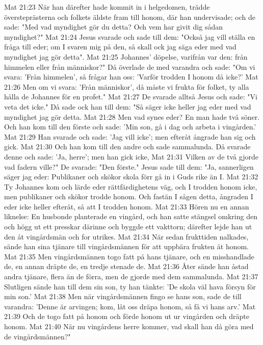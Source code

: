 Mat 21:23  När han därefter hade kommit in i helgedomen, trädde översteprästerna och folkets äldste fram till honom, där han undervisade; och de sade: "Med vad myndighet gör du detta? Och vem har givit dig sådan myndighet?"
Mat 21:24  Jesus svarade och sade till dem: "Också jag vill ställa en fråga till eder; om I svaren mig på den, så skall ock jag säga eder med vad myndighet jag gör detta".
Mat 21:25  Johannes' döpelse, varifrån var den: från himmelen eller från människor?" Då överlade de med varandra och sade: "Om vi svara: 'Från himmelen', så frågar han oss: 'Varför trodden I honom då icke?'
Mat 21:26  Men om vi svara: 'Från människor', då måste vi frukta för folket, ty alla hålla de Johannes för en profet."
Mat 21:27  De svarade alltså Jesus och sade: "Vi veta det icke." Då sade ock han till dem: "Så säger icke heller jag eder med vad myndighet jag gör detta.
Mat 21:28  Men vad synes eder? En man hade två söner. Och han kom till den förste och sade: 'Min son, gå i dag och arbeta i vingården.'
Mat 21:29  Han svarade och sade: 'Jag vill icke'; men efteråt ångrade han sig och gick.
Mat 21:30  Och han kom till den andre och sade sammalunda. Då svarade denne och sade: 'Ja, herre'; men han gick icke,
Mat 21:31  Vilken av de två gjorde vad fadern ville?" De svarade: "Den förste." Jesus sade till dem: "Ja, sannerligen säger jag eder: Publikaner och skökor skola förr gå in i Guds rike än I.
Mat 21:32  Ty Johannes kom och lärde eder rättfärdighetens väg, och I trodden honom icke, men publikaner och skökor trodde honom. Och fastän I sågen detta, ångraden I eder icke heller efteråt, så att I trodden honom.
Mat 21:33  Hören nu en annan liknelse: En husbonde planterade en vingård, och han satte stängsel omkring den och högg ut ett presskar därinne och byggde ett vakttorn; därefter lejde han ut den åt vingårdsmän och for utrikes.
Mat 21:34  När sedan frukttiden nalkades, sände han sina tjänare till vingårdsmännen för att uppbära frukten åt honom.
Mat 21:35  Men vingårdsmännen togo fatt på hans tjänare, och en misshandlade de, en annan dräpte de, en tredje stenade de.
Mat 21:36  Åter sände han åstad andra tjänare, flera än de förra, men de gjorde med dem sammalunda.
Mat 21:37  Slutligen sände han till dem sin son, ty han tänkte: 'De skola väl hava försyn för min son.'
Mat 21:38  Men när vingårdsmännen fingo se hans son, sade de till varandra: 'Denne är arvingen; kom, låt oss dräpa honom, så få vi hans arv.'
Mat 21:39  Och de togo fatt på honom och förde honom ut ur vingården och dräpte honom.
Mat 21:40  När nu vingårdens herre kommer, vad skall han då göra med de vingårdsmännen?"
